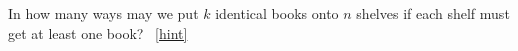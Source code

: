 \documentclass{book}
\begin{document}
\setcounter{project}{127}
\addtocounter{project}{-1}
\begin{activity}[]\label{activity-120}
\hypertarget{p-900}{}%
In how many ways may we put \(k\) identical books onto \(n\) shelves if each shelf must get at least one book?%
~\hfill{\tiny\hyperlink{a-127}{[hint]}\hypertarget{q-127}{}}\end{activity}
\end{document}
